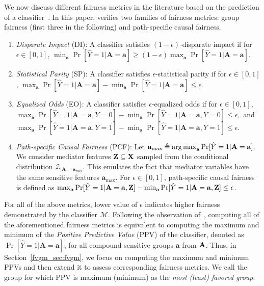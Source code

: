  	We now discuss different fairness metrics in the literature based on the prediction of a classifier~\cite{feldman2015certifying,hardt2016equality,nabi2018fair}.  	
 	In this paper, {\fvgm} verifies two families of fairness metrics: group fairness (first three in the following) and path-specific causal fairness.

 	\begin{enumerate}[leftmargin=*]
 		\itemsep0em 
 		\item \textit{Disparate Impact} (DI): A classifier  satisfies $(1 - \epsilon)$-disparate impact if for $\epsilon \in [0,1] $,
 		$
 		\min_{\mathbf{a}} \Pr[\hat{Y} =1 | \mathbf{A} =  \mathbf{a}]  \ge (1 - \epsilon) \max_{\mathbf{a}} \Pr[\hat{Y} =1 | \mathbf{A} =  \mathbf{a}].
 		$
 		\item \textit{Statistical Parity} (SP): A classifier satisfies $\epsilon$-statistical parity if for $\epsilon \in [0,1] $, 
 		$
 		\max_{\mathbf{a}} \Pr[\hat{Y} =1 | \mathbf{A} =  \mathbf{a}] - \min_{\mathbf{a}} \Pr[\hat{Y} =1 | \mathbf{A} =  \mathbf{a}] \le \epsilon.
 		$
 		\item \textit{Equalized Odds} (EO): 	A classifier satisfies $\epsilon$-equalized odds if for $\epsilon \in [0,1] $,
 		$ \max_{\mathbf{a}}\Pr[\hat{Y} =1 |\mathbf{A}= \mathbf{a}, Y= 0  ] - \min_{\mathbf{a}}\Pr [\hat{Y} = 1|\mathbf{A}= \mathbf{a}, Y = 0] \le \epsilon, $ and $
 		\max_{\mathbf{a}}\Pr[\hat{Y} =1 |\mathbf{A}= \mathbf{a}, Y= 1  ] - \min_{\mathbf{a}}\Pr [\hat{Y} = 1|\mathbf{A}= \mathbf{a}, Y = 1] \le \epsilon.
 		$
 		\item \textit{Path-specific Causal Fairness} (PCF): 
 		Let $ \mathbf{a}_{\max}  \triangleq \operatorname*{arg\,max}_{ \mathbf{a}} \Pr[\hat{Y} =1 |\mathbf{A}=  \mathbf{a}] $. We consider mediator features $ \mathbf{Z} \subseteq \mathbf{X} $ sampled from the conditional distribution $ {\mathcal{Z}_{|\mathbf{A} = \mathbf{a}_{\max}}} $. This emulates the fact that mediator variables have the same sensitive features $ \mathbf{a}_{\max} $.  For $ \epsilon \in [0,1] $,  path-specific causal fairness is defined as 
 		$
 		\max_{\mathbf{a}}\Pr[\hat{Y} = 1 | \mathbf{A} =  \mathbf{a}, \mathbf{Z}] - \min_{\mathbf{a}}\Pr[\hat{Y} = 1 | \mathbf{A} = \mathbf{a}, \mathbf{Z} ] \le \epsilon
 		$.
 	\end{enumerate}

 	  For all of the above metrics, lower value of $\epsilon$ indicates higher fairness demonstrated by the classifier $\mathcal{M}$. Following the observation of~\cite{ghosh2020justicia},  computing all of the aforementioned fairness metrics is equivalent to computing the maximum and minimum of the \textit{Positive Predictive Value} (PPV) of the classifier, denoted as $\Pr[\hat{Y}=1|\mathbf{A} =\mathbf{a}]$, for all compound sensitive groups $\mathbf{a}$ from $ \mathbf{A} $. Thus, in Section~\ref{fvgm_sec:fvgm}, we focus on computing the maximum and minimum PPVs and then extend it to assess corresponding fairness metrics. We call the group for which PPV is maximum (minimum) as the \textit{most (least) favored group}.
 
